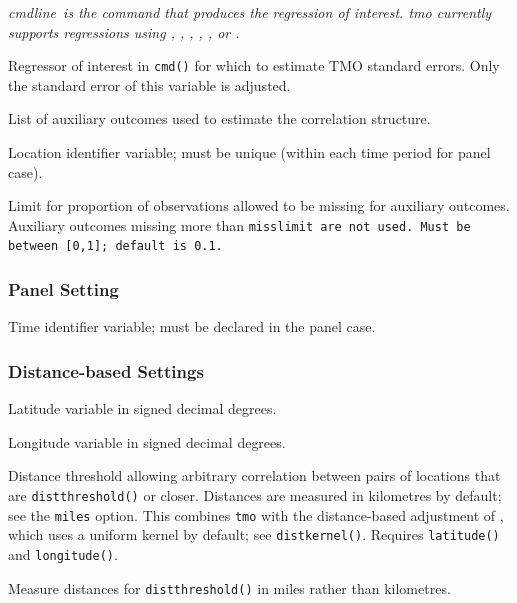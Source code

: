 \documentclass[varwidth,bib]{statapress}
\begin{document}
 \it cmdline\rm\ is the command that produces the regression of interest. \rm tmo currently supports regressions using , , , , , or .

 Regressor of interest in {\tt cmd()} for which to estimate TMO standard errors.  Only the standard error of this variable is adjusted.

 List of auxiliary outcomes used to estimate the correlation structure.

 Location identifier variable; must be unique (within each time period for panel case).

 Limit for proportion of observations allowed to be missing for auxiliary outcomes. Auxiliary outcomes missing more than \tt misslimit \rm are not used. Must be between [0,1]; default is 0.1.

\subsubsection*{Panel Setting}
 Time identifier variable; must be declared in the panel case.

\subsubsection*{Distance-based Settings}
 Latitude variable in signed decimal degrees.

 Longitude variable in signed decimal degrees.

 Distance threshold allowing arbitrary correlation between pairs of locations that are {\tt distthreshold()} or closer.  Distances are measured in kilometres by default; see the {\tt miles} option.  This combines {\tt tmo} with the distance-based adjustment of \citet{Conley1999}, which uses a uniform kernel by default; see {\tt distkernel()}.  Requires {\tt latitude()} and {\tt longitude()}.

 Measure distances for {\tt distthreshold()} in miles rather than kilometres.
\end{document}
